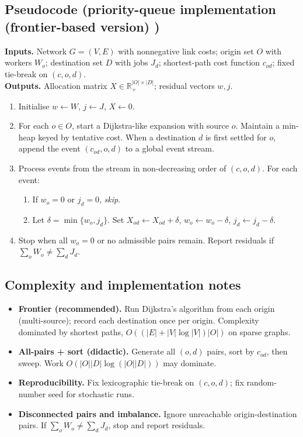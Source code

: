 \subsection{Pseudocode (priority-queue implementation (frontier-based version)
)}\label{si:pseudocode}
\noindent\textbf{Inputs.} Network $G=(V,E)$ with nonnegative link costs; origin set $O$ with workers $W_o$; destination set $D$ with jobs $J_d$; shortest-path cost function $c_{od}$; fixed tie-break on $(c,o,d)$.\\
\textbf{Outputs.} Allocation matrix $X\in\mathbb{R}_{+}^{|O|\times|D|}$; residual vectors $w, j$.

\begin{enumerate}
    \item Initialise $w\leftarrow W$, $j\leftarrow J$, $X\leftarrow 0$.
    \item For each $o\in O$, start a Dijkstra-like expansion with source $o$. Maintain a min-heap keyed by tentative cost. When a destination $d$ is first settled for $o$, append the event $(c_{od},o,d)$ to a global event stream.
    \item Process events from the stream in non-decreasing order of $(c,o,d)$. For each event:
    \begin{enumerate}
        \item If $w_o=0$ or $j_d=0$, \emph{skip}.
        \item Let $\delta=\min\{w_o,j_d\}$. Set $X_{od}\leftarrow X_{od}+\delta$, $w_o\leftarrow w_o-\delta$, $j_d\leftarrow j_d-\delta$.
    \end{enumerate}
    \item Stop when all $w_o=0$ or no admissible pairs remain. Report residuals if $\sum_o W_o\neq \sum_d J_d$.
\end{enumerate}


\subsection{Complexity and implementation notes}\label{si:complexity}
\begin{itemize}
\item \textbf{Frontier (recommended).} Run Dijkstra's algorithm from each origin (multi-source); record each destination once per origin. Complexity dominated by shortest paths, $O\!\left((|E|+|V|\log|V|)|O|\right)$ on sparse graphs.
\item \textbf{All-pairs + sort (didactic).} Generate all $(o,d)$ pairs, sort by $c_{od}$, then sweep. Work $O(|O||D|\log(|O||D|))$ may dominate.
\item \textbf{Reproducibility.} Fix lexicographic tie-break on $(c,o,d)$; fix random-number seed for stochastic runs.
\item \textbf{Disconnected pairs and imbalance.} Ignore unreachable origin-destination pairs. If $\sum_o W_o\neq\sum_d J_d$, stop and report residuals.
\end{itemize}


